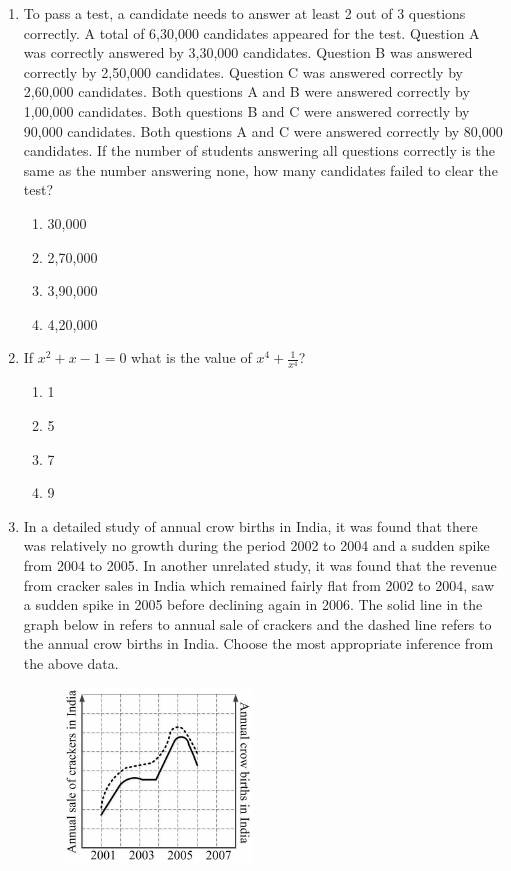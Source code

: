 \documentclass[journal,12pt,onecolumn]{IEEEtran}
\theoremstyle{remark}
\begin{document}
\begin{enumerate}
    \item To pass a test, a candidate needs to answer at least 2 out of 3 questions correctly. A total of 6,30,000 candidates appeared for the test. Question A was correctly answered by 3,30,000 candidates. Question B was answered correctly by 2,50,000 candidates. Question C was answered correctly by 2,60,000 candidates. Both questions A and B were answered correctly by 1,00,000 candidates. Both questions B and C were answered correctly by 90,000 candidates. Both questions A and C were answered correctly by 80,000 candidates. If the number of students answering all questions correctly is the same as the number answering none, how many candidates failed to clear the test?
    \hfill{} \begin{enumerate}
        \item 30,000
        \item 2,70,000
        \item 3,90,000
        \item 4,20,000
    \end{enumerate}

    \item If $x^2 + x - 1 = 0$ what is the value of $x^4 + \frac{1}{x^4}$?
    \hfill{} \begin{enumerate}
        \item 1
        \item 5
        \item 7
        \item 9
    \end{enumerate}

    \item In a detailed study of annual crow births in India, it was found that there was relatively no growth during the period 2002 to 2004 and a sudden spike from 2004 to 2005. In another unrelated study, it was found that the revenue from cracker sales in India which remained fairly flat from 2002 to 2004, saw a sudden spike in 2005 before declining again in 2006. The solid line in the graph below in  refers to annual sale of crackers and the dashed line refers to the annual crow births in India. Choose the most appropriate inference from the above data.

    \begin{figure}[H]
        \centering
        \caption{} \label{fig:10} \includegraphics{figs/10.png}
    \end{figure}


\end{enumerate}
\end{document}
